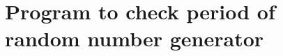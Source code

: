 \chapter{Program to check period of random number generator}
\label{app:appendixB}

\begin{lstlisting}[frame=tb]

\end{lstlisting}

